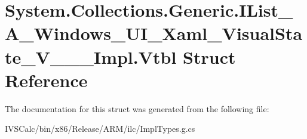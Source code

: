 \hypertarget{struct_system_1_1_collections_1_1_generic_1_1_i_list___a___windows___u_i___xaml___visual_state___v_______impl_1_1_vtbl}{}\section{System.\+Collections.\+Generic.\+I\+List\+\_\+\+A\+\_\+\+Windows\+\_\+\+U\+I\+\_\+\+Xaml\+\_\+\+Visual\+State\+\_\+\+V\+\_\+\+\_\+\+\_\+\+Impl.\+Vtbl Struct Reference}
\label{struct_system_1_1_collections_1_1_generic_1_1_i_list___a___windows___u_i___xaml___visual_state___v_______impl_1_1_vtbl}


The documentation for this struct was generated from the following file\+:\begin{DoxyCompactItemize}
\item 
I\+V\+S\+Calc/bin/x86/\+Release/\+A\+R\+M/ilc/Impl\+Types.\+g.\+cs\end{DoxyCompactItemize}
